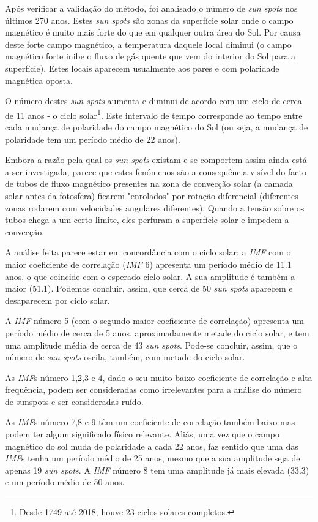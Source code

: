 \documentclass[letterpaper]{article}
\begin{document}
\begin{multicols}{2}
\par Após verificar a validação do método, foi analisado o número de \textit{sun spots} nos últimos 270 anos. Estes \textit{sun spots} são zonas da superfície solar onde o campo magnético é muito mais forte do que em qualquer outra área do Sol. Por causa deste forte campo magnético, a temperatura daquele local diminui (o campo magnético forte inibe o fluxo de gás quente que vem do interior do Sol para a superfície). Estes locais aparecem usualmente aos pares e com polaridade magnética oposta.
\par O número destes \textit{sun spots} aumenta e diminui de acordo com um ciclo de cerca de 11 anos - o ciclo solar\footnote{Desde 1749 até 2018, houve 23 ciclos solares completos.}. Este intervalo de tempo corresponde ao tempo entre cada mudança de polaridade do campo magnético do Sol (ou seja, a mudança de polaridade tem um período médio de 22 anos).
\par Embora a razão pela qual os \textit{sun spots} existam e se comportem assim ainda está a ser investigada, parece que estes fenómenos são a consequência visível do facto de tubos de fluxo magnético presentes na zona de convecção solar (a camada solar antes da fotosfera) ficarem "enrolados" por rotação diferencial (diferentes zonas rodarem com velocidades angulares diferentes). Quando a tensão sobre os tubos chega a um certo limite, eles perfuram a superfície solar e impedem a convecção. 
\par A análise feita parece estar em concordância com o ciclo solar: a \textit{IMF} com o maior coeficiente de correlação (\textit{IMF} 6) apresenta um período médio de 11.1 anos, o que coincide com o esperado ciclo solar. A sua amplitude é também a maior (51.1). Podemos concluir, assim, que cerca de 50 \textit{sun spots} aparecem e desaparecem por ciclo solar.
\par A \textit{IMF} número 5 (com o segundo maior coeficiente de correlação) apresenta um período médio de cerca de 5 anos, aproximadamente metade do ciclo solar, e tem uma amplitude média de cerca de 43 \textit{sun spots}. Pode-se concluir, assim, que o número de \textit{sun spots} oscila, também, com metade do ciclo solar. 
\par As \textit{IMF}s número 1,2,3 e 4, dado o seu muito baixo coeficiente de correlação e alta frequência, podem ser consideradas como irrelevantes para a análise do número de sunspots e ser consideradas ruído.
\par As \textit{IMF}s número 7,8 e 9 têm um coeficiente de correlação também baixo mas podem ter algum significado físico relevante. Aliás, uma vez que o campo magnético do sol muda de polaridade a cada 22 anos, faz sentido que uma das \textit{IMF}s tenha um período médio de 25 anos, mesmo que a sua amplitude seja de apenas 19 \textit{sun spots}. A \textit{IMF} número 8 tem uma amplitude já mais elevada (33.3) e um período médio de 50 anos.

\end{multicols}
\end{document}
